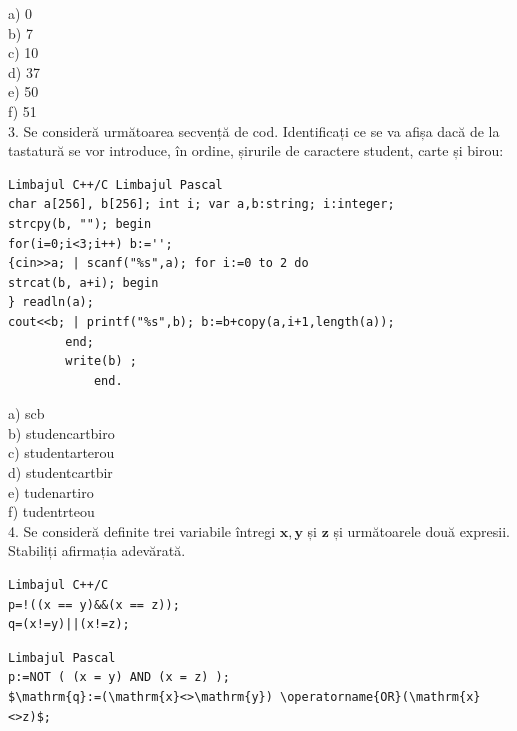 \documentclass[10pt]{article}
\begin{document}
a) 0\\
b) 7\\
c) 10\\
d) 37\\
e) 50\\
f) 51\\
3. Se consideră următoarea secvență de cod. Identificați ce se va afișa dacă de la tastatură se vor introduce, în ordine, șirurile de caractere student, carte și birou:

\begin{verbatim}
Limbajul C++/C Limbajul Pascal
char a[256], b[256]; int i; var a,b:string; i:integer;
strcpy(b, ""); begin
for(i=0;i<3;i++) b:='';
{cin>>a; | scanf("%s",a); for i:=0 to 2 do
strcat(b, a+i); begin
} readln(a);
cout<<b; | printf("%s",b); b:=b+copy(a,i+1,length(a));
        end;
        write(b) ;
            end.
\end{verbatim}

a) scb\\
b) studencartbiro\\
c) studentarterou\\
d) studentcartbir\\
e) tudenartiro\\
f) tudentrteou\\
4. Se consideră definite trei variabile întregi $\mathbf{x}, \mathbf{y}$ și $\mathbf{z}$ și următoarele două expresii. Stabiliți afirmația adevărată.

\begin{verbatim}
Limbajul C++/C
p=!((x == y)&&(x == z));
q=(x!=y)||(x!=z);
\end{verbatim}

\begin{verbatim}
Limbajul Pascal
p:=NOT ( (x = y) AND (x = z) );
$\mathrm{q}:=(\mathrm{x}<>\mathrm{y}) \operatorname{OR}(\mathrm{x}<>z)$;
\end{verbatim}
\end{document}
